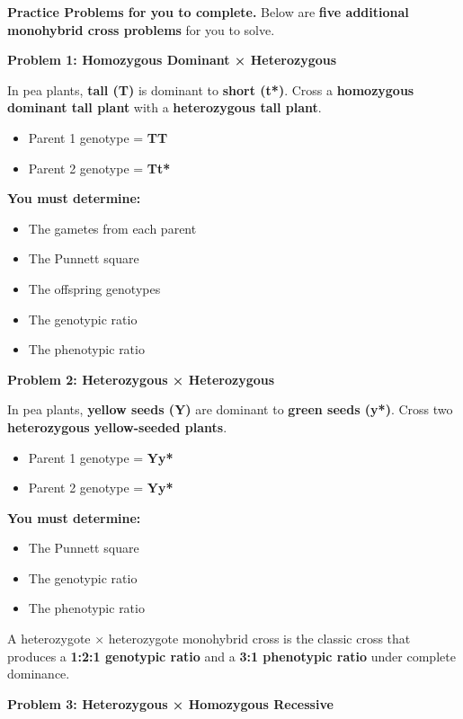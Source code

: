 \documentclass[
  letterpaper,
  DIV=11,
  numbers=noendperiod]{scrreprt}
\begin{document}
\textbf{Practice Problems for you to complete.} Below are \textbf{five
additional monohybrid cross problems} for you to solve.

\textbf{Problem 1: Homozygous Dominant × Heterozygous}

In pea plants, \textbf{tall (T)} is dominant to \textbf{short (t*)}.
Cross a \textbf{homozygous dominant tall plant} with a
\textbf{heterozygous tall plant}.

\begin{itemize}
\item
  Parent 1 genotype = \textbf{TT}
\item
  Parent 2 genotype = \textbf{Tt*}
\end{itemize}

\textbf{You must determine:}

\begin{itemize}
\item
  The gametes from each parent
\item
  The Punnett square
\item
  The offspring genotypes
\item
  The genotypic ratio
\item
  The phenotypic ratio
\end{itemize}

\textbf{Problem 2: Heterozygous × Heterozygous}

In pea plants, \textbf{yellow seeds (Y)} are dominant to \textbf{green
seeds (y*)}. Cross two \textbf{heterozygous yellow-seeded plants}.

\begin{itemize}
\item
  Parent 1 genotype = \textbf{Yy*}
\item
  Parent 2 genotype = \textbf{Yy*}
\end{itemize}

\textbf{You must determine:}

\begin{itemize}
\item
  The Punnett square
\item
  The genotypic ratio
\item
  The phenotypic ratio
\end{itemize}

A heterozygote × heterozygote monohybrid cross is the classic cross that
produces a \textbf{1:2:1 genotypic ratio} and a \textbf{3:1 phenotypic
ratio} under complete dominance.

\textbf{Problem 3: Heterozygous × Homozygous Recessive}
\end{document}
